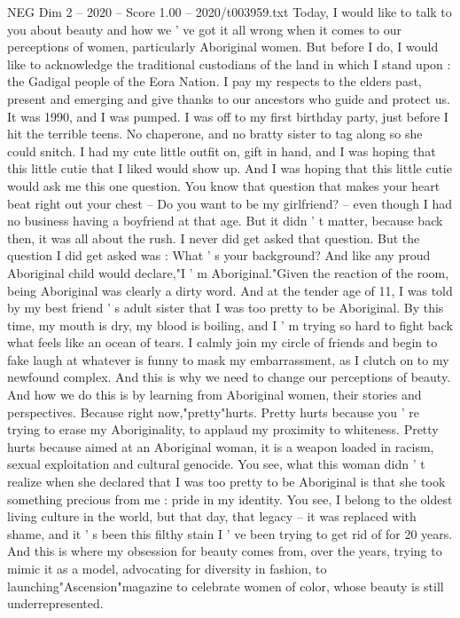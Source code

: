 \begin{textsample}{NEG Dim 2 – 2020 – Score 1.00 – 2020/t003959.txt}  \label{ex:f2_neg_078}
Today, I would like to talk to you about beauty and how we ' ve got it all wrong when it comes to our perceptions of women, particularly Aboriginal women.
But before I do, I would like to acknowledge the traditional custodians of the land in which I stand upon : the Gadigal people of the Eora Nation.
I pay my respects to the elders past, present and emerging and give thanks to our ancestors who guide and protect us.
It was 1990, and I was pumped.
I was off to my first birthday party, just before I hit the terrible teens.
No chaperone, and no bratty sister to tag along so she could snitch.
I had my cute little outfit on, gift in hand, and I was hoping that this little cutie that I liked would show up.
And I was hoping that this little cutie would ask me this one question.
You know that question that makes your heart beat right out your chest -- Do you want to be my girlfriend? -- even though I had no business having a boyfriend at that age.
But it didn ' t matter, because back then, it was all about the rush.
I never did get asked that question.
But the question I did get asked was : What ' s your background?
And like any proud Aboriginal child would declare,"I ' m Aboriginal."Given the reaction of the room, being Aboriginal was clearly a dirty word.
And at the tender age of 11, I was told by my best friend ' s adult sister that I was too pretty to be Aboriginal.
By this time, my mouth is dry, my blood is boiling, and I ' m trying so hard to fight back what feels like an ocean of tears.
I calmly join my circle of friends and begin to fake laugh at whatever is funny to mask my embarrassment, as I clutch on to my newfound complex.
And this is why we need to change our perceptions of beauty.
And how we do this is by learning from Aboriginal women, their stories and perspectives.
Because right now,"pretty"hurts.
Pretty hurts because you ' re trying to erase my Aboriginality, to applaud my proximity to whiteness.
Pretty hurts because aimed at an Aboriginal woman, it is a weapon loaded in racism, sexual exploitation and cultural genocide.
You see, what this woman didn ' t realize when she declared that I was too pretty to be Aboriginal is that she took something precious from me : pride in my identity.
You see, I belong to the oldest living culture in the world, but that day, that legacy -- it was replaced with shame, and it ' s been this filthy stain I ' ve been trying to get rid of for 20 years.
And this is where my obsession for beauty comes from, over the years, trying to mimic it as a model, advocating for diversity in fashion, to launching"Ascension"magazine to celebrate women of color, whose beauty is still underrepresented.

\end{textsample}
